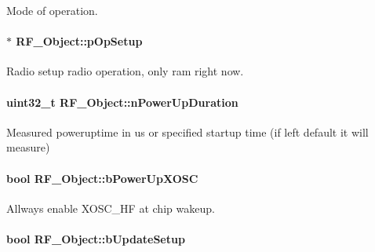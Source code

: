Mode of operation. 

\paragraph[{p\+Op\+Setup}]{$\ast$ R\+F\+\_\+\+Object\+::p\+Op\+Setup}\label{struct_r_f___object_a1a082f0e3e4d1cc3d42438e9c008731a}


Radio setup radio operation, only ram right now. 

\paragraph[{n\+Power\+Up\+Duration}]{\setlength{\rightskip}{0pt plus 5cm}uint32\+\_\+t R\+F\+\_\+\+Object\+::n\+Power\+Up\+Duration}\label{struct_r_f___object_a1c977babafc1c400ee7065d588400d62}


Measured poweruptime in us or specified startup time (if left default it will measure) 

\paragraph[{b\+Power\+Up\+X\+O\+S\+C}]{\setlength{\rightskip}{0pt plus 5cm}bool R\+F\+\_\+\+Object\+::b\+Power\+Up\+X\+O\+S\+C}\label{struct_r_f___object_a2639ebccaae9e421775673e83d477d93}


Allways enable X\+O\+S\+C\+\_\+\+H\+F at chip wakeup. 

\paragraph[{b\+Update\+Setup}]{\setlength{\rightskip}{0pt plus 5cm}bool R\+F\+\_\+\+Object\+::b\+Update\+Setup}\label{struct_r_f___object_aca08b9616cfe2b6be9699edea541334d}


